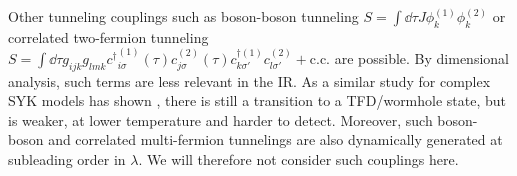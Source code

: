 Other tunneling couplings such as boson-boson tunneling $S=\int\dd\tau J\phi^{(1)}_k\phi^{(2)}_k$ or correlated two-fermion tunneling $S=\int\dd\tau g_{ijk}g_{lmk} {c^\dagger}^{(1)}_{i\sigma}(\tau)c^{(2)}_{j\sigma}(\tau) c^{\dagger(1)}_{k\sigma'}c^{(2)}_{l\sigma'} +\text{c.c.}$ are possible. By dimensional analysis, such terms are less relevant in the IR. As a similar study for complex SYK models has shown \cite{sahoo_traversable_2020}, there is still a transition to a TFD/wormhole state, but is weaker, at lower temperature and harder to detect. Moreover, such boson-boson and correlated multi-fermion tunnelings are also dynamically generated at subleading order in $\lambda$. We will therefore not consider such couplings here. 


